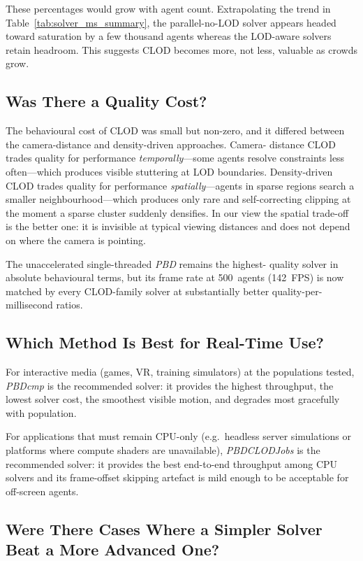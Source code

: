 These percentages would grow with agent count.  Extrapolating the
trend in Table~\ref{tab:solver_ms_summary}, the parallel-no-LOD solver
appears headed toward saturation by a few thousand agents whereas the
LOD-aware solvers retain headroom.  This suggests CLOD becomes more,
not less, valuable as crowds grow.

\subsection{Was There a Quality Cost?}

The behavioural cost of CLOD was small but non-zero, and it differed
between the camera-distance and density-driven approaches.  Camera-
distance CLOD trades quality for performance \emph{temporally}---some
agents resolve constraints less often---which produces visible
stuttering at LOD boundaries.  Density-driven CLOD trades quality for
performance \emph{spatially}---agents in sparse regions search a
smaller neighbourhood---which produces only rare and self-correcting
clipping at the moment a sparse cluster suddenly densifies.  In our
view the spatial trade-off is the better one: it is invisible at
typical viewing distances and does not depend on where the camera is
pointing.

The unaccelerated single-threaded \textit{PBD} remains the highest-
quality solver in absolute behavioural terms, but its frame rate at
500~agents (142~FPS) is now matched by every CLOD-family solver at
substantially better quality-per-millisecond ratios.

\subsection{Which Method Is Best for Real-Time Use?}

For interactive media (games, VR, training simulators) at the
populations tested, \textit{PBDcmp} is the recommended solver: it
provides the highest throughput, the lowest solver cost, the smoothest
visible motion, and degrades most gracefully with population.

For applications that must remain CPU-only (e.g.\ headless server
simulations or platforms where compute shaders are unavailable),
\textit{PBDCLODJobs} is the recommended solver: it provides the best
end-to-end throughput among CPU solvers and its frame-offset skipping
artefact is mild enough to be acceptable for off-screen agents.

\subsection{Were There Cases Where a Simpler Solver Beat a More Advanced One?}

